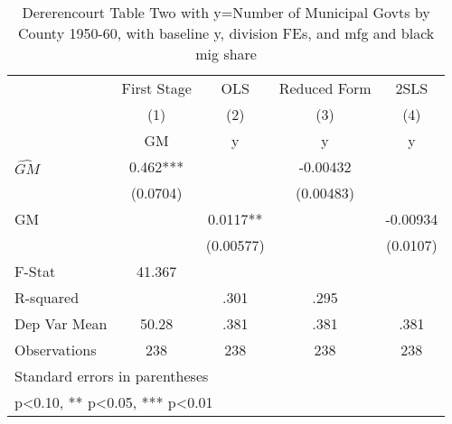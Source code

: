 \begin{table}[htbp]\centering
\def\sym#1{\ifmmode^{#1}\else\(^{#1}\)\fi}
\caption{Dererencourt Table Two with y=Number of Municipal Govts by County 1950-60, with baseline y, division FEs, and mfg and black mig share}
\begin{tabular}{l*{4}{c}}
\toprule
                    & First Stage   &         OLS   &Reduced Form   &        2SLS   \\
                    &\multicolumn{1}{c}{(1)}&\multicolumn{1}{c}{(2)}&\multicolumn{1}{c}{(3)}&\multicolumn{1}{c}{(4)}\\
                    &\multicolumn{1}{c}{GM}&\multicolumn{1}{c}{y}&\multicolumn{1}{c}{y}&\multicolumn{1}{c}{y}\\
\midrule
$\hat{GM}$          &       0.462***&               &    -0.00432   &               \\
                    &    (0.0704)   &               &   (0.00483)   &               \\
\addlinespace
GM                  &               &      0.0117** &               &    -0.00934   \\
                    &               &   (0.00577)   &               &    (0.0107)   \\
\midrule
F-Stat              &      41.367   &               &               &               \\
R-squared           &               &        .301   &        .295   &               \\
Dep Var Mean        &       50.28   &        .381   &        .381   &        .381   \\
Observations        &         238   &         238   &         238   &         238   \\
\bottomrule
\multicolumn{5}{l}{\footnotesize Standard errors in parentheses}\\
\multicolumn{5}{l}{\footnotesize * p<0.10, ** p<0.05, *** p<0.01}\\
\end{tabular}
\end{table}
